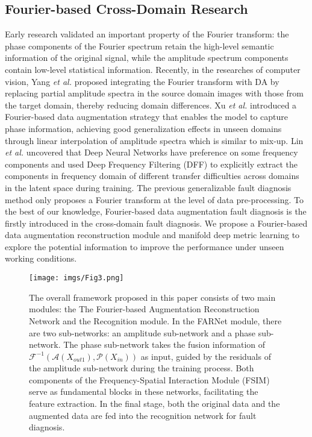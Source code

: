 \subsection{Fourier-based Cross-Domain Research}
Early research \cite{r18} validated an important property of the Fourier transform: the phase components of the Fourier spectrum retain the high-level semantic information of the original signal, while the amplitude spectrum components contain low-level statistical information. Recently, in the researches of computer vision, Yang \textit{et al.} \cite{r23} proposed integrating the Fourier transform with DA by replacing partial amplitude spectra in the source domain images with those from the target domain, thereby reducing domain differences. Xu \textit{et al.} \cite{r24} introduced a Fourier-based data augmentation strategy that enables the model to capture phase information, achieving good generalization effects in unseen domains through linear interpolation of amplitude spectra which is similar to mix-up. Lin \textit{et al.} \cite{r41} uncovered that Deep Neural Networks have preference on some frequency components and used Deep Frequency Filtering (DFF) to explicitly extract the components in frequency domain of different transfer difficulties across domains in the latent space during training. The previous generalizable fault diagnosis method \cite{r42} only proposes a Fourier transform at the level of data pre-processing. To the best of our knowledge, Fourier-based data augmentation fault diagnosis is the firstly introduced in the cross-domain fault diagnosis. We propose a Fourier-based data augmentation reconstruction module and manifold deep metric learning to explore the potential information to improve the performance under unseen working conditions.


\begin{figure*}[ht]
\centerline{\texttt{[image: imgs/Fig3.png]}}\caption{The overall framework proposed in this paper consists of two main modules: the The Fourier-based Augmentation Reconstruction Network and the Recognition module. In the FARNet module, there are two sub-networks: an amplitude sub-network and a phase sub-network. The phase sub-network takes the fusion information of $\mathcal{F}^{-1}(\mathcal{A}(X_{out1}),\mathcal{P}(X_{in}))$ as input, guided by the residuals of the amplitude sub-network during the training process. Both components of the Frequency-Spatial Interaction Module (FSIM) serve as fundamental blocks in these networks, facilitating the feature extraction. In the final stage, both the original data and the augmented data are fed into the recognition network for fault diagnosis.}
\label{fig3}
\end{figure*}